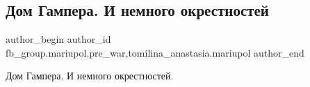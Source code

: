  
 
 
 
 

\subsection{Дом Гампера. И немного окрестностей}
\label{sec:12_02_2023.fb.fb_group.mariupol.pre_war.5.dom_gampera__i_nemno}
 
\ifcmt
 author_begin
   author_id fb_group.mariupol.pre_war,tomilina_anastasia.mariupol
 author_end
\fi

Дом Гампера. И немного окрестностей.

